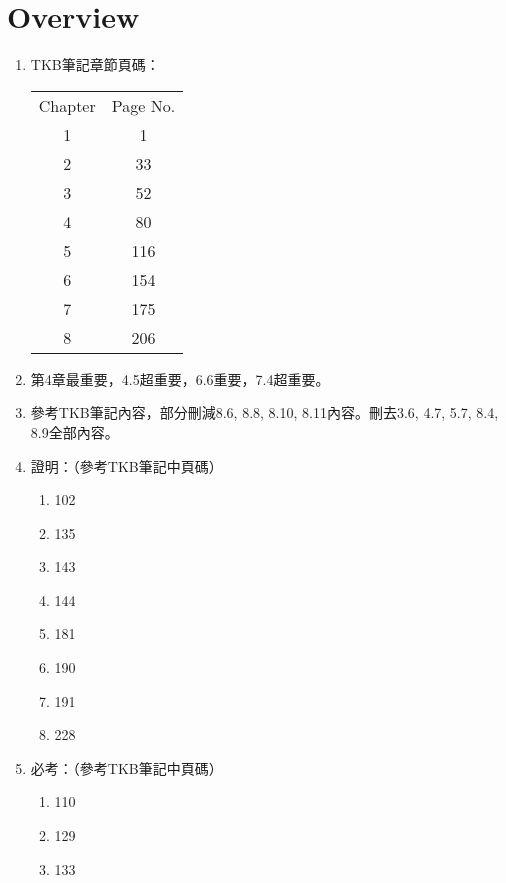 \section{Overview}

\begin{enumerate}
    \item TKB筆記\cite{4}章節頁碼：
    \begin{table}[H]
        \centering
        \begin{tabular}{|c|c|}
            \hline
            Chapter & Page No. \\
            \Xhline{2\arrayrulewidth}
            1 & 1 \\
            \hline
            2 & 33 \\
            \hline
            3 & 52 \\
            \hline
            4 & 80 \\
            \hline
            5 & 116 \\
            \hline
            6 & 154 \\
            \hline
            7 & 175 \\
            \hline
            8 & 206 \\
            \hline
        \end{tabular}
    \end{table}
    \item 第4章最重要，4.5超重要，6.6重要，7.4超重要。
    \item 參考TKB筆記\cite{4}內容，部分刪減8.6, 8.8, 8.10, 8.11內容。刪去3.6, 4.7, 5.7, 8.4, 8.9全部內容。
    \item 證明：（參考TKB筆記\cite{4}中頁碼）
    \begin{enumerate}
        \item 102
        \item 135
        \item 143
        \item 144
        \item 181
        \item 190
        \item 191
        \item 228
    \end{enumerate}
    \item 必考：（參考TKB筆記\cite{4}中頁碼）
    \begin{enumerate}
        \item 110
        \item 129
        \item 133

\end{enumerate}
\end{enumerate}
